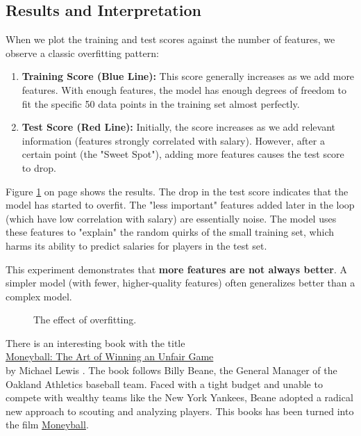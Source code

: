 \subsection{Results and Interpretation}
When we plot the training and test scores against the number of features, we observe a classic overfitting pattern:
\begin{enumerate}
\item \textbf{Training Score (Blue Line):} This score generally increases as we add more features. With enough
      features, the model has enough degrees of freedom to fit the specific 50 data points in the training set
      almost perfectly. 
\item \textbf{Test Score (Red Line):} Initially, the score increases as we add relevant information (features
      strongly correlated with salary). However, after a certain point (the "Sweet Spot"), adding more features
      causes the test score to drop. 
\end{enumerate}
Figure \ref{fig:overfitting.png} on page \pageref{fig:overfitting.png} shows the results.
The drop in the test score indicates that the model has started to overfit. The "less important" features added
later in the loop (which have low correlation with salary) are essentially noise. The model uses these features
to "explain" the random quirks of the small training set, which harms its ability to predict salaries for
players in the test set. 

This experiment demonstrates that \textbf{more features are not always better}. A simpler model (with fewer,
higher-quality features) often generalizes better than a complex model. 

\begin{figure}[!th]
\caption{The effect of overfitting.}
\label{fig:overfitting.png}
\end{figure}

\remark
There is an interesting book with the title
\\[0.2cm]
\hspace*{1.3cm}
\href{https://wwnorton.com/books/Moneyball/}{Moneyball: The Art of Winning an Unfair Game} 
\\[0.2cm]
by Michael Lewis \cite{lewis:2003}.  The book follows Billy Beane, the General Manager  of the Oakland Athletics baseball
team. Faced with a tight budget and unable to compete with wealthy teams like the New York Yankees, Beane
adopted a radical new approach to scouting and analyzing players. This books has been turned into the film
\href{https://www.rottentomatoes.com/m/moneyball}{Moneyball}.

